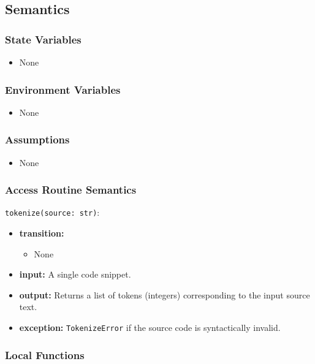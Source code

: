\documentclass[12pt, titlepage]{article}
\begin{document}
\begin{itemize}
\subsection{Semantics}

\subsubsection{State Variables}

\begin{itemize}
    \item None
\end{itemize}

\subsubsection{Environment Variables}

\begin{itemize}
  \item None
\end{itemize}

\subsubsection{Assumptions}

\begin{itemize}
    \item None
\end{itemize}

\subsubsection{Access Routine Semantics}

\noindent \texttt{tokenize(source: str)}:
\begin{itemize}
    \item \textbf{transition:}
    \begin{itemize}
        \item None
    \end{itemize}
    \item \textbf{input:} A single code snippet.
    \item \textbf{output:} Returns a list of tokens (integers) corresponding to the input source text.
    \item \textbf{exception:} \texttt{TokenizeError} if the source code is syntactically invalid.
\end{itemize}

\subsubsection{Local Functions}


\end{itemize}
\end{document}
